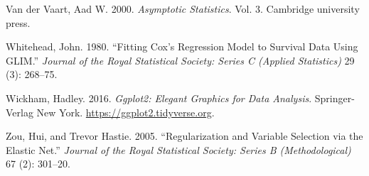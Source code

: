 \begin{CSLReferences}{1}{0}
\leavevmode{}%
Van der Vaart, Aad W. 2000. \emph{Asymptotic Statistics}. Vol. 3. Cambridge university press.

\leavevmode{}%
Whitehead, John. 1980. {``Fitting Cox's Regression Model to Survival Data Using GLIM.''} \emph{Journal of the Royal Statistical Society: Series C (Applied Statistics)} 29 (3): 268--75.

\leavevmode{}%
Wickham, Hadley. 2016. \emph{Ggplot2: Elegant Graphics for Data Analysis}. Springer-Verlag New York. \url{https://ggplot2.tidyverse.org}.

\leavevmode{}%
Zou, Hui, and Trevor Hastie. 2005. {``Regularization and Variable Selection via the Elastic Net.''} \emph{Journal of the Royal Statistical Society: Series B (Methodological)} 67 (2): 301--20.

\end{CSLReferences}



\address{%
Sahir Rai Bhatnagar*\\
McGill University\\%
2001 McGill College Avenue Montreal, QC, Canada H3A 1G1\\
%
\url{http://sahirbhatnagar.com/}\\%
%
%
}

\address{%
Maxime Turgeon*\\
University of Manitoba\\%
186 Dysart Road Winnipeg, MB, Canada R3T 2N2\\
%
\url{https://maxturgeon.ca/}\\%
%
%
}

\address{%
Jesse Islam\\
McGill University\\%
2001 McGill College Avenue Montreal, QC, Canada H3A 1G1\\
%
%
%
%
}

\address{%
James A. Hanley\\
McGill University\\%
2001 McGill College Avenue Montreal, QC, Canada H3A 1G1\\
%
\url{http://www.medicine.mcgill.ca/epidemiology/hanley/}\\%
%
%
}

\address{%
Olli Saarela\\
University of Toronto\\%
Dalla Lana School of Public Health, 155 College Street, 6th floor, Toronto, Ontario M5T 3M7, Canada\\
%
\url{http://individual.utoronto.ca/osaarela/}\\%
%
%
}
